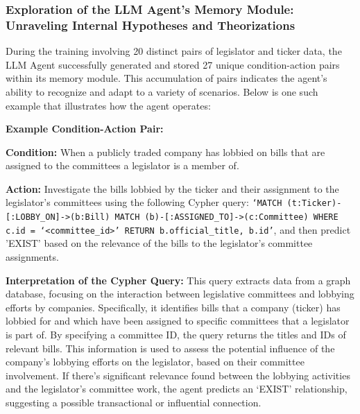 \documentclass[15pt,letterpaper]{article}
\begin{document}
\subsubsection{Exploration of the LLM Agent's Memory Module: Unraveling Internal Hypotheses and Theorizations}

During the training involving 20 distinct pairs of legislator and ticker data, the LLM Agent successfully generated and stored 27 unique condition-action pairs within its memory module. 
This accumulation of pairs indicates the agent's ability to recognize and adapt to a variety of scenarios. 
Below is one such example that illustrates how the agent operates:

\vspace{5mm} %

\begin{mdframed}
\textbf{Example Condition-Action Pair:}

\textbf{Condition:} When a publicly traded company has lobbied on bills that are assigned to the committees a legislator is a member of.

\textbf{Action:} Investigate the bills lobbied by the ticker and their assignment to the legislator's committees using the following Cypher query: \texttt{`MATCH (t:Ticker)-[:LOBBY\_ON]->(b:Bill) MATCH (b)-[:ASSIGNED\_TO]->(c:Committee) WHERE c.id = `<committee\_id>' RETURN b.official\_title, b.id'}, and then predict 'EXIST' based on the relevance of the bills to the legislator's committee assignments.

\textbf{Interpretation of the Cypher Query:} This query extracts data from a graph database, focusing on the interaction between legislative committees and lobbying efforts by companies. Specifically, it identifies bills that a company (ticker) has lobbied for and which have been assigned to specific committees that a legislator is part of. By specifying a committee ID, the query returns the titles and IDs of relevant bills. This information is used to assess the potential influence of the company's lobbying efforts on the legislator, based on their committee involvement. 
If there's significant relevance found between the lobbying activities and the legislator's committee work, the agent predicts an `EXIST' relationship, suggesting a possible transactional or influential connection.
\end{mdframed}

\vspace{5mm} %
\end{document}
